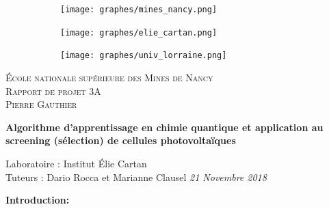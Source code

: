 \documentclass[a4paper,12pt,titlepage]{report}
\begin{document}
\begin{titlepage}
 
	\begin{center}
	\begin{figure}[!h]
	\centering	
		\begin{subfigure}[b]{0.3\textwidth}
		\texttt{[image: graphes/mines\_nancy.png]}
		\end{subfigure}
		\begin{subfigure}[b]{0.3\textwidth}
		\texttt{[image: graphes/elie\_cartan.png]}
		\end{subfigure}
		\begin{subfigure}[b]{0.3\textwidth}
		\texttt{[image: graphes/univ\_lorraine.png]}
	\end{subfigure}
	\end{figure}
 
	\textsc{École nationale supérieure des Mines de Nancy}\\[2cm]
	\textsc{Rapport de projet 3A}\\[1cm]
	\textsc{Pierre Gauthier}\\[1cm]
 
	\begin{doublespace}
		{ \huge \bfseries{Algorithme d'apprentissage en chimie quantique et application au screening (sélection) de cellules photovoltaïques}}\\[2cm]
	\end{doublespace}
	\textmd{Laboratoire : Institut Élie Cartan}\\[1cm]
	\textmd{Tuteurs : Dario Rocca et Marianne Clausel}
	\vfill
	{\textit{{\large 21 Novembre 2018}}}
 
	\end{center}
\end{titlepage}

\tableofcontents

\newpage



\textbf{\Huge Introduction:} \\
\newline
\end{document}
